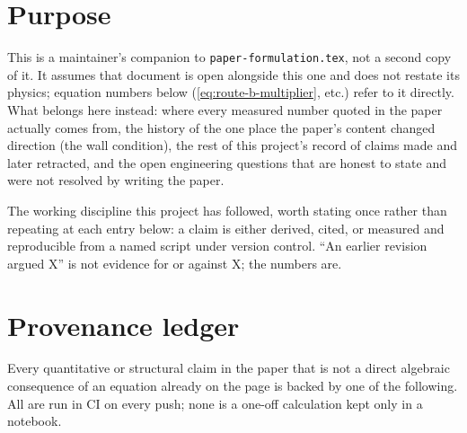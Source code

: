 \section{Purpose}

This is a maintainer's companion to \texttt{paper-formulation.tex}, not a second copy of it. It assumes that document is open alongside this one and does not restate its physics; equation numbers below (\eqref{eq:route-b-multiplier}, etc.) refer to it directly. What belongs here instead: where every measured number quoted in the paper actually comes from, the history of the one place the paper's content changed direction (the wall condition), the rest of this project's record of claims made and later retracted, and the open engineering questions that are honest to state and were not resolved by writing the paper.

The working discipline this project has followed, worth stating once rather than repeating at each entry below: a claim is either derived, cited, or measured and reproducible from a named script under version control. ``An earlier revision argued X'' is not evidence for or against X; the numbers are.

\section{Provenance ledger}
\label{sec:ledger}

Every quantitative or structural claim in the paper that is not a direct algebraic consequence of an equation already on the page is backed by one of the following. All are run in CI on every push; none is a one-off calculation kept only in a notebook.

